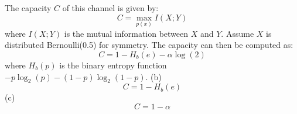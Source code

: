 \documentclass[11pt]{article}
\begin{document}
\begin{description}
                The capacity \(C\) of this channel is given by:
                \[
                C = \max_{p(x)} I(X; Y)
                \]
                where \(I(X; Y)\) is the mutual information between \(X\) and \(Y\). Assume \(X\) is distributed Bernoulli(0.5) for symmetry. The capacity can then be computed as:
                \[
                C = 1 - H_b(e) - \alpha \log(2)
                \]
                where \(H_b(p)\) is the binary entropy function \( -p \log_2(p) - (1-p) \log_2(1-p) \).
        \subitem(b)
            \[C = 1 - H_b(e)\]
        \subitem(c)
            \[C = 1 - \alpha\]


\end{description}
\end{document}
